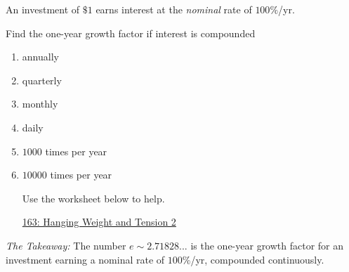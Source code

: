 \documentclass{ximera}
\begin{document}
\begin{example}  \label{E9re3rfdmer3110}
An investment of $\$1$ earns interest at the \emph{nominal} rate of $100\%$/yr.

Find the one-year growth factor if interest is compounded
\begin{enumerate}
\item annually

\item quarterly

\item monthly

\item daily

\item $1000$ times per year

\item $10000$ times per year

Use the worksheet below to help.

\begin{onlineOnly}
    \begin{center}
\end{center}
\end{onlineOnly}

\href{https://www.desmos.com/calculator/mbeajby8bb}{163: Hanging Weight and Tension 2}

\end{enumerate}
\end{example}

\emph{The Takeaway:} The number $e\sim 2.71828...$ is the one-year growth factor for an investment earning a nominal rate of $100\%$/yr, compounded continuously.
\end{document}
